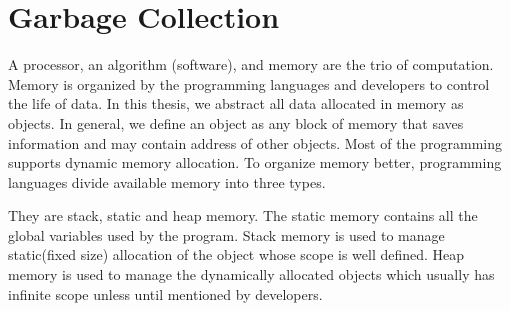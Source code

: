\begin{comment}
This chapter provides the background information regarding the problem discussed in the thesis. Section
~\ref{intro:gc} describes the fundamental idea behind necessity of garbage collection. Advanced readers can skip the section ~\ref{intro:gc}. Section ~\ref{intro:motv} discusses the advantages of the garbage collection and problem statement of the thesis. Section ~\ref{intro:contr} describes all the contributions of this thesis to solve the problem mentioned in section ~\ref{intro:motv}. Section ~\ref{intro:do} helps the readers to understand how the thesis is organized.
\end{comment}
\section{Garbage Collection}
\label{intro:gc}

A processor, an algorithm (software), and memory are the trio of computation. Memory is organized by the programming languages and developers to control the life of data. In this thesis, we abstract all data allocated in memory as objects. In general, we define an object as any block of memory that saves information and may contain address of other objects. Most of the programming supports dynamic memory allocation. To organize memory better, programming languages divide available memory into three types. 
\begin {comment}
All programming languages are designed to perform complex computations. Computation contains three main ingredients : Processing unit, algorithm, and memory. Processing unit i.e., the processor is the unit which performs arithmetic, and logical operations required. Algorithm dictates the sequence of operation to performed on the data to get the desired output. Algorithm implemented in a programming language is usually referred as program and collection of programs are called software. Memory saves the input, intermediate results and final output of the computation. 
In this thesis, we are more concerned with object-oriented programming languages and object represents user-defined dynamically allocated data. Developers write algorithms in a specific programming language. Programming language organizes the memory consumed by the algorithm. Modern programming languages use three different memories to organize it.
\end{comment} 
They are stack, static and heap memory. The static memory contains all the global variables used by the program. Stack memory is used to manage static(fixed size) allocation of the object whose scope is well defined. Heap memory is used to manage the dynamically allocated objects which usually has infinite scope unless until mentioned by developers. 


